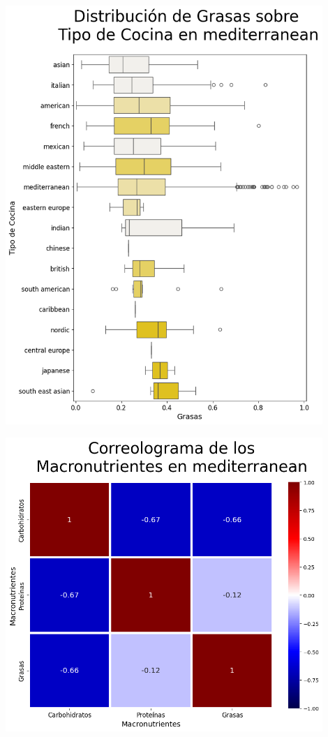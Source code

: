 \documentclass[12pt,a4paper]{article}
\begin{document}
            \begin{center}
                \includegraphics[width=0.90\textwidth]{Resources/2_03_plot_03_3.png}
            \end{center}

            \begin{center}
                \includegraphics[width=0.90\textwidth]{Resources/2_03_plot_03_4.png}
            \end{center}
\end{document}
